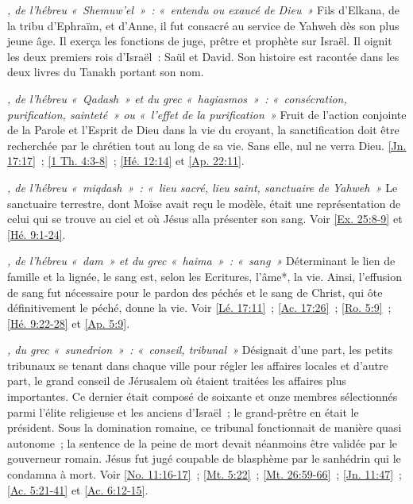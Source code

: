 \begin{multicols}{2}
\textit{, de l'hébreu «~Shemuw'el~»~: «~entendu ou exaucé de Dieu~»}\newline
Fils d'Elkana, de la tribu d'Ephraïm, et d'Anne, il fut consacré au service de Yahweh dès son plus jeune âge. Il exerça les fonctions de juge, prêtre et prophète sur Israël. Il oignit les deux premiers rois d'Israël~: Saül et David. Son histoire est racontée dans les deux livres du Tanakh portant son nom.

\textit{, de l'hébreu «~Qadash~» et du grec «~hagiasmos~»~: «~consécration, purification, sainteté~» ou «~l'effet de la purification~»}\newline
Fruit de l'action conjointe de la Parole et l'Esprit de Dieu dans la vie du croyant, la sanctification doit être recherchée par le chrétien tout au long de sa vie. Sans elle, nul ne verra Dieu. \vref{Jn. 17:17}~; \vref{1 Th. 4:3-8}~; \vref{Hé. 12:14} et \vref{Ap. 22:11}.

\textit{, de l'hébreu «~miqdash~»~: «~lieu sacré, lieu saint, sanctuaire de Yahweh~»}\newline
Le sanctuaire terrestre, dont Moïse avait reçu le modèle, était une représentation de celui qui se trouve au ciel et où Jésus alla présenter son sang. Voir \vref{Ex. 25:8-9} et \vref{Hé. 9:1-24}.

\textit{, de l'hébreu «~dam~» et du grec «~haima~»~: «~sang~»}\newline
Déterminant le lien de famille et la lignée, le sang est, selon les Ecritures, l'âme*, la vie. Ainsi, l'effusion de sang fut nécessaire pour le pardon des péchés et le sang de Christ, qui ôte définitivement le péché, donne la vie.\newline
Voir \vref{Lé. 17:11}~; \vref{Ac. 17:26}~; \vref{Ro. 5:9}~; \vref{Hé. 9:22-28} et \vref{Ap. 5:9}.

\textit{, du grec «~sunedrion~»~: «~conseil, tribunal~»}\newline
Désignait d'une part, les petits tribunaux se tenant dans chaque ville pour régler les affaires locales et d'autre part, le grand conseil de Jérusalem où étaient traitées les affaires plus importantes. Ce dernier était composé de soixante et onze membres sélectionnés parmi l'élite religieuse et les anciens d'Israël~; le grand-prêtre en était le président. Sous la domination romaine, ce tribunal fonctionnait de manière quasi autonome~; la sentence de la peine de mort devait néanmoins être validée par le gouverneur romain. Jésus fut jugé coupable de blasphème par le sanhédrin qui le condamna à mort.\newline
Voir \vref{No. 11:16-17}~; \vref{Mt. 5:22}~; \vref{Mt. 26:59-66}~; \vref{Jn. 11:47}~; \vref{Ac. 5:21-41} et \vref{Ac. 6:12-15}.


\end{multicols}
